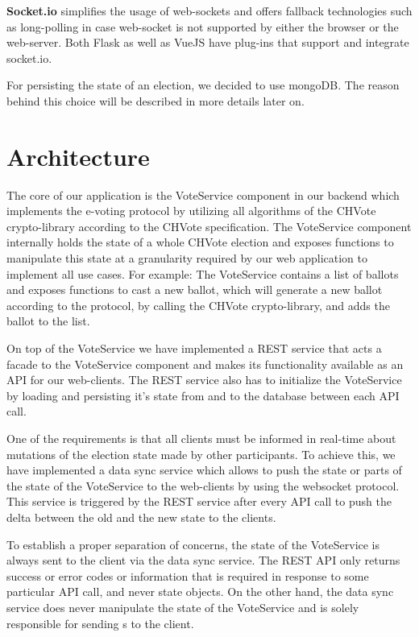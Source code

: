 \textbf{Socket.io} simplifies the usage of web-sockets and offers fallback technologies such as long-polling in case web-socket is not supported by either the browser or the web-server. Both Flask as well as VueJS have plug-ins that support and integrate socket.io.

For persisting the state of an election, we decided to use mongoDB. The reason behind this choice will be described in more details later on.

\section{Architecture}
The core of our application is the VoteService component in our backend which implements the e-voting protocol by utilizing all algorithms of the CHVote crypto-library according to the CHVote specification. The VoteService component internally holds the state of a whole CHVote election and exposes functions to manipulate this state at a granularity required by our web application to implement all use cases. For example: The VoteService contains a list of ballots and exposes functions to cast a new ballot, which will generate a new ballot according to the protocol, by calling the CHVote crypto-library, and adds the ballot to the list.

On top of the VoteService we have implemented a REST service that acts a facade to the VoteService component and makes its functionality available as an API for our web-clients. The REST service also has to initialize the VoteService by loading and persisting it's state from and to the database between each API call.

One of the requirements is that all clients must be informed in real-time about mutations of the election state made by other participants. To achieve this, we have implemented a data sync service which allows to push the state or parts of the state of the VoteService to the web-clients by using the websocket protocol. This service is triggered by the REST service after every API call to push the delta between the old and the new state to the clients.

To establish a proper separation of concerns, the state of the VoteService is always sent to the client via the data sync service. The REST API only returns success or error codes or information that is required in response to some particular API call, and never state objects. On the other hand, the data sync service does never manipulate the state of the VoteService and is solely responsible for sending s to the client.


